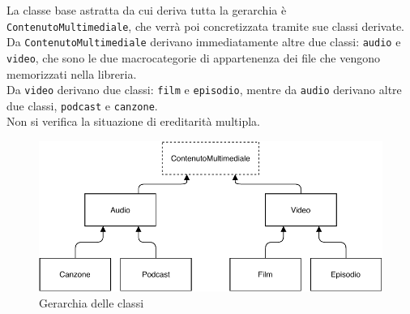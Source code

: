 \documentclass[a4paper,10pt]{article}
\begin{document}
La classe base astratta da cui deriva tutta la gerarchia è \texttt{ContenutoMultimediale}, che verrà poi concretizzata tramite sue classi derivate.
Da \texttt{ContenutoMultimediale} derivano immediatamente altre due classi: \texttt{audio} e \texttt{video}, che sono le due macrocategorie di appartenenza dei file che vengono memorizzati nella libreria. \\
Da \texttt{video} derivano due classi: \texttt{film} e \texttt{episodio}, mentre da \texttt{audio} derivano altre due classi, \texttt{podcast} e \texttt{canzone}. \\
Non si verifica la situazione di ereditarità multipla. \\
\begin{figure}[H]
	\begin{center}
		\includegraphics[width=\textwidth,keepaspectratio]{classi.pdf}
	\end{center}
	\caption{\label{fig:my-label} Gerarchia delle classi}
\end{figure}
\end{document}
